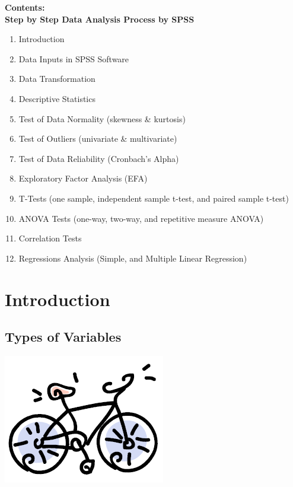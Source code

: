 \documentclass[
  letterpaper,
  DIV=11,
  numbers=noendperiod]{scrreprt}
\providecommand{\tightlist}{%
  \setlength{\itemsep}{0pt}\setlength{\parskip}{0pt}}\usepackage{longtable,booktabs,array}
\begin{document}
\textbf{Contents:}\\
\textbf{Step by Step Data Analysis Process by SPSS}\\

\begin{enumerate}
\def\labelenumi{\arabic{enumi}.}
\tightlist
\item
  Introduction\\
\item
  Data Inputs in SPSS Software\\
\item
  Data Transformation\\
\item
  Descriptive Statistics\\
\item
  Test of Data Normality (skewness \& kurtosis)\\
\item
  Test of Outliers (univariate \& multivariate)\\
\item
  Test of Data Reliability (Cronbach's Alpha)\\
\item
  Exploratory Factor Analysis (EFA)\\
\item
  T-Tests (one sample, independent sample t-test, and paired sample
  t-test)\\
\item
  ANOVA Tests (one-way, two-way, and repetitive measure ANOVA)\\
\item
  Correlation Tests\\
\item
  Regressions Analysis (Simple, and Multiple Linear Regression)\\
\end{enumerate}


\chapter{Introduction}\label{introduction}

\section{Types of Variables}\label{types-of-variables}

\includegraphics{images/bicycle.png}
\end{document}
